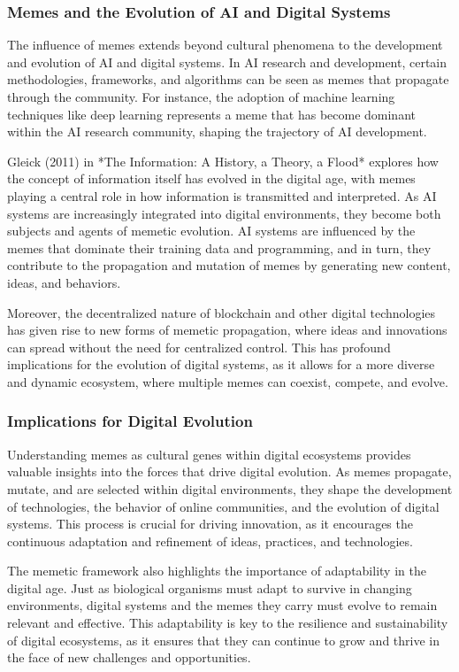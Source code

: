 \documentclass[12pt,twoside]{article}
\begin{document}
\subsubsection{Memes and the Evolution of AI and Digital Systems}

The influence of memes extends beyond cultural phenomena to the development and evolution of AI and digital systems. In AI research and development, certain methodologies, frameworks, and algorithms can be seen as memes that propagate through the community. For instance, the adoption of machine learning techniques like deep learning represents a meme that has become dominant within the AI research community, shaping the trajectory of AI development.

Gleick (2011) in *The Information: A History, a Theory, a Flood* explores how the concept of information itself has evolved in the digital age, with memes playing a central role in how information is transmitted and interpreted. As AI systems are increasingly integrated into digital environments, they become both subjects and agents of memetic evolution. AI systems are influenced by the memes that dominate their training data and programming, and in turn, they contribute to the propagation and mutation of memes by generating new content, ideas, and behaviors.

Moreover, the decentralized nature of blockchain and other digital technologies has given rise to new forms of memetic propagation, where ideas and innovations can spread without the need for centralized control. This has profound implications for the evolution of digital systems, as it allows for a more diverse and dynamic ecosystem, where multiple memes can coexist, compete, and evolve.

\subsubsection{Implications for Digital Evolution}

Understanding memes as cultural genes within digital ecosystems provides valuable insights into the forces that drive digital evolution. As memes propagate, mutate, and are selected within digital environments, they shape the development of technologies, the behavior of online communities, and the evolution of digital systems. This process is crucial for driving innovation, as it encourages the continuous adaptation and refinement of ideas, practices, and technologies.

The memetic framework also highlights the importance of adaptability in the digital age. Just as biological organisms must adapt to survive in changing environments, digital systems and the memes they carry must evolve to remain relevant and effective. This adaptability is key to the resilience and sustainability of digital ecosystems, as it ensures that they can continue to grow and thrive in the face of new challenges and opportunities.
\end{document}
